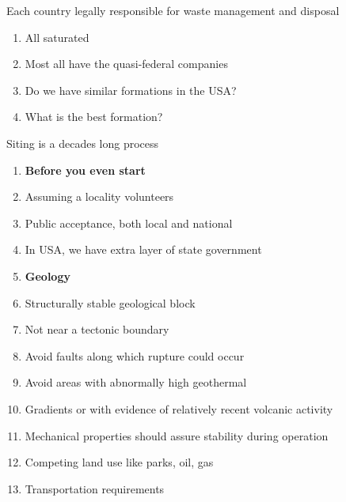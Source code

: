 \documentclass[aspectratio=1610,pdftex,dvipsnames,compress,xcolor={dvipsnames}]{beamer}
\begin{document}
\begin{frame}{Each country legally responsible for waste management and disposal}
    \begin{enumerate}[series=outerlist,topsep=0pt,itemsep=21pt,leftmargin=*,label=(\arabic*)]
        \item[]All saturated
        \item[]Most all have the quasi-federal companies
        \item[]Do we have similar formations in the USA?
        \item[]What is the best formation?
    \end{enumerate}
\end{frame}


\begin{frame}{Siting is a decades long process}
    \begin{enumerate}[series=outerlist,topsep=0pt,itemsep=1pt,leftmargin=*,label=(\arabic*)]
        \item[]\textbf{Before you even start}
        \item[]Assuming a locality volunteers
        \item[]Public acceptance, both local and national
        \item[]In USA, we have extra layer of state government
            \vspace{0.10in}
        \item[]\textbf{Geology}
        \item[]Structurally stable geological block 
        \item[]Not near a tectonic boundary
        \item[]Avoid faults along which rupture could occur
        \item[]Avoid areas with abnormally high geothermal
        \item[]Gradients or with evidence of relatively recent volcanic activity
        \item[]Mechanical properties should assure stability during operation
        \item[]Competing land use like parks, oil, gas
        \item[]Transportation requirements
    \end{enumerate}
\end{frame}
\end{document}
